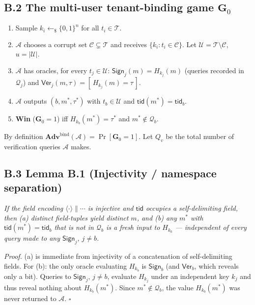 \subsection{\texorpdfstring{B.2 The multi-user tenant-binding game
\(\mathbf{G}_0\)}{B.2 The multi-user tenant-binding game \textbackslash mathbf\{G\}\_0}}\label{b2-the-multi-user-tenant-binding-game-mathbfg_0}

\begin{enumerate}
\def\labelenumi{\arabic{enumi}.}
\tightlist
\item
  Sample \(k_i\leftarrow_\$\{0,1\}^n\) for all \(t_i\in\mathcal{T}\).
\item
  \(\mathcal{A}\) chooses a corrupt set
  \(\mathcal{C}\subsetneq\mathcal{T}\) and receives
  \(\{k_i: t_i\in\mathcal{C}\}\). Let
  \(\mathcal{U}=\mathcal{T}\setminus\mathcal{C}\), \(u=|\mathcal{U}|\).
\item
  \(\mathcal{A}\) has oracles, for every \(t_j\in\mathcal{U}\):
  \(\mathsf{Sign}_j(m)=H_{k_j}(m)\) (queries recorded in
  \(\mathcal{Q}_j\)) and
  \(\mathsf{Ver}_j(m,\tau)=[\,H_{k_j}(m)=\tau\,]\).
\item
  \(\mathcal{A}\) outputs \((b,m^*,\tau^*)\) with
  \(t_b\in\mathcal{U}\) and \(\mathsf{tid}(m^*)=\mathsf{tid}_b\).
\item
  \textbf{Win} (\(\mathbf{G}_0=1\)) iff \(H_{k_b}(m^*)=\tau^*\) and
  \(m^*\notin\mathcal{Q}_b\).
\end{enumerate}

By definition
\(\mathbf{Adv}^{\text{bind}}(\mathcal{A})=\Pr[\mathbf{G}_0=1]\). Let
\(Q_v\) be the total number of verification queries \(\mathcal{A}\)
makes.

\subsection{B.3 Lemma B.1 (Injectivity / namespace
separation)}\label{b3-lemma-b1-injectivity--namespace-separation}

\emph{If the field encoding \(\langle\cdot\rangle\|\cdots\) is injective
and \(\mathsf{tid}\) occupies a self-delimiting field, then (a) distinct
field-tuples yield distinct \(m\), and (b) any \(m^*\) with
\(\mathsf{tid}(m^*)=\mathsf{tid}_b\) that is not in \(\mathcal{Q}_b\)
is a fresh input to \(H_{k_b}\) --- independent of every query made to
any \(\mathsf{Sign}_j\), \(j\neq b\).}

\emph{Proof.} (a) is immediate from injectivity of a concatenation of
self-delimiting fields. For (b): the only oracle evaluating \(H_{k_b}\)
is \(\mathsf{Sign}_b\) (and \(\mathsf{Ver}_b\), which reveals only a
bit). Queries to \(\mathsf{Sign}_j\), \(j\neq b\), evaluate \(H_{k_j}\)
under an independent key \(k_j\) and thus reveal nothing about
\(H_{k_b}(m^*)\). Since \(m^*\notin\mathcal{Q}_b\), the value
\(H_{k_b}(m^*)\) was never returned to \(\mathcal{A}\). \(\square\)

